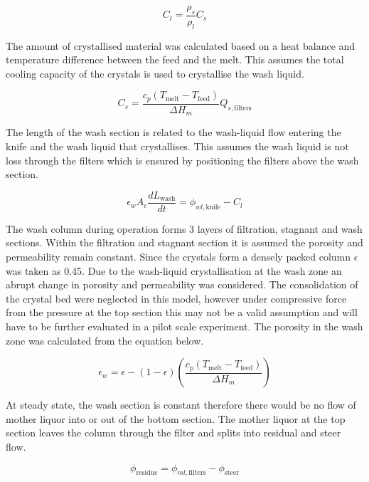 \begin{equation}
C_l= \frac{\rho_s}{\rho_l}C_s
\end{equation}

The amount of crystallised material was calculated based on a heat balance and temperature difference between the feed and the melt. This assumes the total cooling capacity of the crystals is used to crystallise the wash liquid. 

\begin{equation}
C_s= \frac{c_p(T_{\mathrm{melt}}-T_{\mathrm{feed}})}{\Delta H_m}Q_{s,\mathrm{filters}}
\end{equation}

The length of the wash section is related to the wash-liquid flow entering the knife and the wash liquid that crystallises. This assumes the wash liquid is not loss through the filters which is ensured by positioning the filters above the wash section.

\begin{equation}
\epsilon_w A_c \frac{dL_{\mathrm{wash}}}{dt}= \phi_{wl,\mathrm{knife}}-C_l
\end{equation}

The wash column during operation forms 3 layers of filtration, stagnant and wash sections. Within the filtration and stagnant section it is assumed the porosity and permeability remain constant. Since the crystals form a densely packed column $\epsilon$ was taken as 0.45. Due to the wash-liquid crystallisation at the wash zone an abrupt change in porosity and permeability was considered. The consolidation of the crystal bed were neglected in this model, however under compressive force from the pressure at the top section this may not be a valid assumption and will have to be further evaluated in a pilot scale experiment. The porosity in the wash zone was calculated from the equation below. 

\begin{equation}
\epsilon_{w}= \epsilon-(1-\epsilon)\left(\frac{c_p(T_{\mathrm{melt}}-T_{\mathrm{feed}})}{\Delta H_m}\right)
\end{equation}

At steady state, the wash section is constant therefore there  would be no flow of mother liquor into or out of the bottom section. The mother liquor at the top section leaves the column through the filter and splits into residual and steer flow. 

\begin{equation}
\phi_{\mathrm{residue}}= \phi_{ml,\mathrm{filters}} - \phi_{\mathrm{steer}}
\end{equation}

